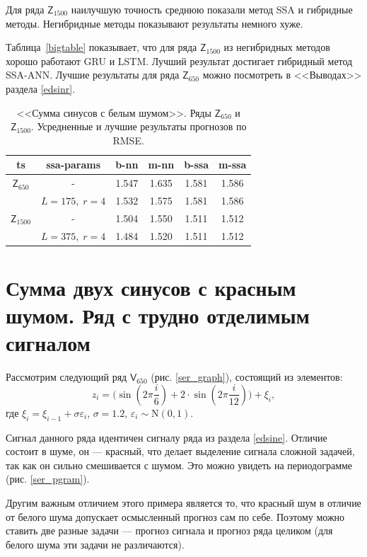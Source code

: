 \documentclass[specialist,
               substylefile = spbu.rtx,
               subf,href,colorlinks=true, 12p]{disser}
\begin{document}
Для ряда $\mathsf{Z}_{1500}$ наилучшую точность среднюю показали метод SSA и гибридные методы. Негибридные методы показывают результаты немного хуже.

Таблица~\ref{bigtable} показывает, что для ряда $\mathsf{Z}_{1500}$ из негибридных методов хорошо работают GRU и LSTM. Лучший результат достигает гибридный метод SSA-ANN. Лучшие результаты для ряда $\mathsf{Z}_{650}$ можно посмотреть в <<Выводах>> раздела \ref{edsinr}.

\begin{table}[h]
	\captionsetup{justification=centering}
	\caption{<<Сумма синусов с белым шумом>>. Ряды $\mathsf{Z}_{650}$ и $\mathsf{Z}_{1500}$. Усредненные и лучшие результаты прогнозов по RMSE.}
	\begin{center}
		\begin{tabular}{cccccc}
			\toprule
			ts &  ssa-params  &  b-nn &  m-nn &  b-ssa &  m-ssa \\
			\midrule
			$\mathsf{Z}_{650}$ & - & 1.547 & 1.635 &  1.581 &  1.586 \\
			& $L = 175, \; r = 4$ & 1.532 & 1.575 &  1.581 &  1.586 \\
			$\mathsf{Z}_{1500}$ & - & 1.504 & 1.550 &  1.511 &  1.512 \\
			& $L = 375, \; r = 4$ & 1.484 & 1.520 &  1.511 &  1.512 \\
			\bottomrule
		\end{tabular}
	\end{center}
	\label{tedsinelen}
\end{table}

\clearpage

\section{Сумма двух синусов с красным шумом. Ряд с трудно отделимым сигналом}
\label{ser}
Рассмотрим следующий ряд $\mathsf{V}_{650}$ (рис. \ref{ser_graph}), состоящий из элементов: $$ z_i = \big(\sin(2 \pi \dfrac{i}{6} ) + 2 \cdot \sin(2 \pi \dfrac{i}{12} ) \big) + \xi_i, $$ где $\xi_i = \xi_{i-1} + \sigma \varepsilon_{i}$, $\sigma = 1.2$, $\varepsilon_i \sim \mathrm{N}(0, 1)$.

Сигнал данного ряда идентичен сигналу ряда из раздела \ref{edsine}. Отличие состоит в шуме, он --- красный, что делает выделение сигнала сложной задачей, так как он сильно смешивается с шумом.  Это можно увидеть на периодограмме (рис. \ref{ser_pgram}).

Другим важным отличием этого примера является то, что красный шум в отличие от белого шума допускает осмысленный прогноз сам по себе. Поэтому можно ставить две разные задачи --- прогноз сигнала и прогноз ряда целиком (для белого шума эти задачи не различаются).
\end{document}
